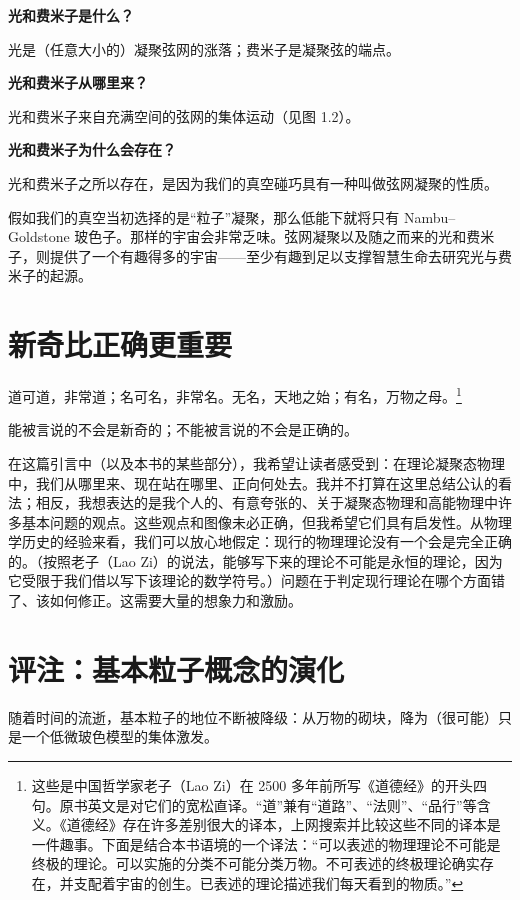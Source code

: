 \textbf{光和费米子是什么？}

光是（任意大小的）凝聚弦网的涨落；费米子是凝聚弦的端点。

\textbf{光和费米子从哪里来？}

光和费米子来自充满空间的弦网的集体运动（见图 1.2）。

\textbf{光和费米子为什么会存在？}

光和费米子之所以存在，是因为我们的真空碰巧具有一种叫做弦网凝聚的性质。

假如我们的真空当初选择的是“粒子”凝聚，那么低能下就将只有 Nambu–Goldstone 玻色子。那样的宇宙会非常乏味。弦网凝聚以及随之而来的光和费米子，则提供了一个有趣得多的宇宙——至少有趣到足以支撑智慧生命去研究光与费米子的起源。

\section{新奇比正确更重要}

\begin{keypoints}
\item 道可道，非常道；名可名，非常名。无名，天地之始；有名，万物之母。\footnote{这些是中国哲学家老子（Lao Zi）在 2500 多年前所写《道德经》的开头四句。原书英文是对它们的宽松直译。“道”兼有“道路”、“法则”、“品行”等含义。《道德经》存在许多差别很大的译本，上网搜索并比较这些不同的译本是一件趣事。下面是结合本书语境的一个译法：“可以表述的物理理论不可能是终极的理论。可以实施的分类不可能分类万物。不可表述的终极理论确实存在，并支配着宇宙的创生。已表述的理论描述我们每天看到的物质。”}
\item 能被言说的不会是新奇的；不能被言说的不会是正确的。
\end{keypoints}

在这篇引言中（以及本书的某些部分），我希望让读者感受到：在理论凝聚态物理中，我们从哪里来、现在站在哪里、正向何处去。我并不打算在这里总结公认的看法；相反，我想表达的是我个人的、有意夸张的、关于凝聚态物理和高能物理中许多基本问题的观点。这些观点和图像未必正确，但我希望它们具有启发性。从物理学历史的经验来看，我们可以放心地假定：现行的物理理论没有一个会是完全正确的。（按照老子（Lao Zi）的说法，能够写下来的理论不可能是永恒的理论，因为它受限于我们借以写下该理论的数学符号。）问题在于判定现行理论在哪个方面错了、该如何修正。这需要大量的想象力和激励。

\section{评注：基本粒子概念的演化}

\begin{keypoints}
\item 随着时间的流逝，基本粒子的地位不断被降级：从万物的砌块，降为（很可能）只是一个低微玻色模型的集体激发。
\end{keypoints}

